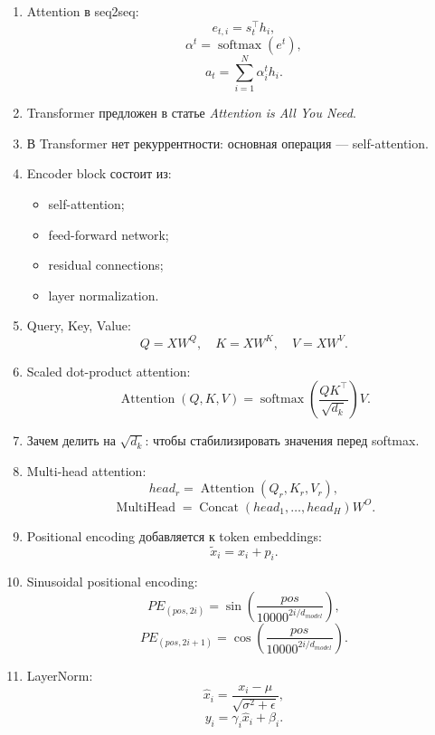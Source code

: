 \documentclass[a4paper,12pt]{article}
\begin{document}
\begin{enumerate}
    \item Attention в seq2seq:
    \[
    e_{t,i}=s_t^\top h_i,
    \]
    \[
    \alpha^t=\operatorname{softmax}(e^t),
    \]
    \[
    a_t=\sum_{i=1}^{N}\alpha_i^t h_i.
    \]

    \item Transformer предложен в статье \textit{Attention is All You Need}.

    \item В Transformer нет рекуррентности: основная операция --- self-attention.

    \item Encoder block состоит из:
    \begin{itemize}
        \item self-attention;
        \item feed-forward network;
        \item residual connections;
        \item layer normalization.
    \end{itemize}

    \item Query, Key, Value:
    \[
    Q=XW^Q,
    \quad
    K=XW^K,
    \quad
    V=XW^V.
    \]

    \item Scaled dot-product attention:
    \[
    \operatorname{Attention}(Q,K,V)
    =
    \operatorname{softmax}
    \left(
    \frac{QK^\top}{\sqrt{d_k}}
    \right)V.
    \]

    \item Зачем делить на \(\sqrt{d_k}\): чтобы стабилизировать значения перед softmax.

    \item Multi-head attention:
    \[
    head_r =
    \operatorname{Attention}(Q_r,K_r,V_r),
    \]
    \[
    \operatorname{MultiHead}
    =
    \operatorname{Concat}(head_1,\dots,head_H)W^O.
    \]

    \item Positional encoding добавляется к token embeddings:
    \[
    \tilde{x}_i = x_i + p_i.
    \]

    \item Sinusoidal positional encoding:
    \[
    PE_{(pos, 2i)}
    =
    \sin
    \left(
    \frac{pos}{10000^{2i/d_{model}}}
    \right),
    \]
    \[
    PE_{(pos, 2i+1)}
    =
    \cos
    \left(
    \frac{pos}{10000^{2i/d_{model}}}
    \right).
    \]

    \item LayerNorm:
    \[
    \hat{x}_i =
    \frac{x_i-\mu}{\sqrt{\sigma^2+\epsilon}},
    \]
    \[
    y_i = \gamma_i \hat{x}_i + \beta_i.
    \]


\end{enumerate}
\end{document}
